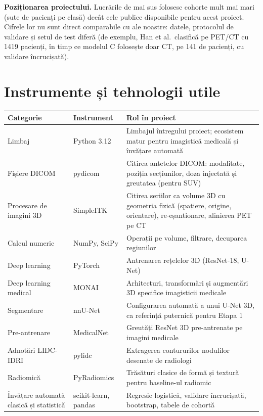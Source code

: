 \documentclass[11pt, a4paper]{article}
\begin{document}
\textbf{Poziționarea proiectului.} Lucrările de mai sus folosesc cohorte mult mai mari (sute de pacienți pe clasă) decât cele publice disponibile pentru acest proiect. Cifrele lor nu sunt direct comparabile cu ale noastre: datele, protocolul de validare și setul de test diferă (de exemplu, Han et al.\ clasifică pe PET/CT cu 1419 pacienți, în timp ce modelul C folosește doar CT, pe 141 de pacienți, cu validare încrucișată).

\section{Instrumente și tehnologii utile}

\begin{table}[h]
\centering
\small
\begin{tabular}{@{}p{3.3cm}p{4.2cm}p{7.1cm}@{}}
\toprule
\textbf{Categorie} & \textbf{Instrument} & \textbf{Rol în proiect} \\ \midrule
Limbaj & Python 3.12 & Limbajul întregului proiect; ecosistem matur pentru imagistică medicală și învățare automată \\
Fișiere DICOM & pydicom & Citirea antetelor DICOM: modalitate, poziția secțiunilor, doza injectată și greutatea (pentru SUV) \\
Procesare de imagini 3D & SimpleITK & Citirea seriilor ca volume 3D cu geometria fizică (spațiere, origine, orientare), re-eșantionare, alinierea PET pe CT \\
Calcul numeric & NumPy, SciPy & Operații pe volume, filtrare, decuparea regiunilor \\
Deep learning & PyTorch & Antrenarea rețelelor 3D (ResNet-18, U-Net) \\
Deep learning medical & MONAI & Arhitecturi, transformări și augmentări 3D specifice imagisticii medicale \\
Segmentare & nnU-Net \cite{isensee2021} & Configurarea automată a unui U-Net 3D, ca referință puternică pentru Etapa 1 \\
Pre-antrenare & MedicalNet \cite{chen2019} & Greutăți ResNet 3D pre-antrenate pe imagini medicale \\
Adnotări LIDC-IDRI & pylidc \cite{hancock2016} & Extragerea contururilor nodulilor desenate de radiologi \\
Radiomică & PyRadiomics & Trăsături clasice de formă și textură pentru baseline-ul radiomic \\
Învățare automată clasică și statistică & scikit-learn, pandas & Regresie logistică, validare încrucișată, bootstrap, tabele de cohortă \\

\end{tabular}
\end{table}
\end{document}
